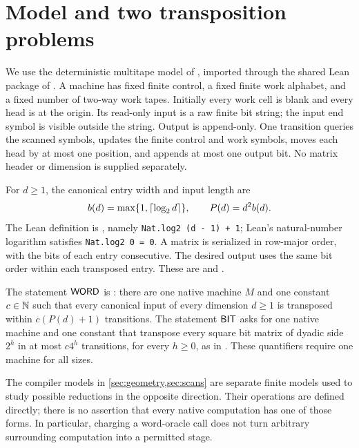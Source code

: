 \section{Model and two transposition problems}
\label{sec:model}
We use the deterministic multitape model of \cite{FirstPaper2026}, imported
through the shared Lean package of \cite{SecondPaper2026}. A machine has fixed
finite control, a fixed finite work alphabet, and a fixed number of two-way
work tapes. Initially every work cell is blank and every head is at the
origin. Its read-only input is a raw finite bit string; the input end symbol
is visible outside the string. Output is append-only. One transition queries
the scanned symbols, updates the finite control and work symbols, moves each
head by at most one position, and appends at most one output bit. No matrix
header or dimension is supplied separately.

For $d\geq1$, the canonical entry width and input length are
\[
 b(d)=\max\{1,\left\lceil \log_2 d\right\rceil\},\qquad P(d)=d^2b(d).
\]
The Lean definition is , namely
{\small\texttt{Nat.log2 (d - 1) + 1}}; Lean's natural-number logarithm satisfies
{\small\texttt{Nat.log2 0 = 0}}.
A matrix is serialized in row-major order, with the bits of each entry
consecutive. The desired output uses the same bit order within each
transposed entry. These are  and
.

The statement $\mathsf{WORD}$ is : there
are one native machine $M$ and one constant $c\in\mathbb N$ such that every canonical
input of every dimension $d\geq1$ is transposed within $c(P(d)+1)$ transitions.
The statement $\mathsf{BIT}$ asks for one native machine and one constant that transpose
every square bit matrix of dyadic side $2^h$ in at most $c4^h$ transitions,
for every $h\geq0$, as in .
These quantifiers require one machine for all sizes.

The compiler models in \cref{sec:geometry,sec:scans} are separate finite
models used to study possible reductions in the opposite direction. Their
operations are defined directly; there is no assertion that every native
computation has one of those forms. In particular, charging a word-oracle
call does not turn arbitrary surrounding computation into a permitted stage.
